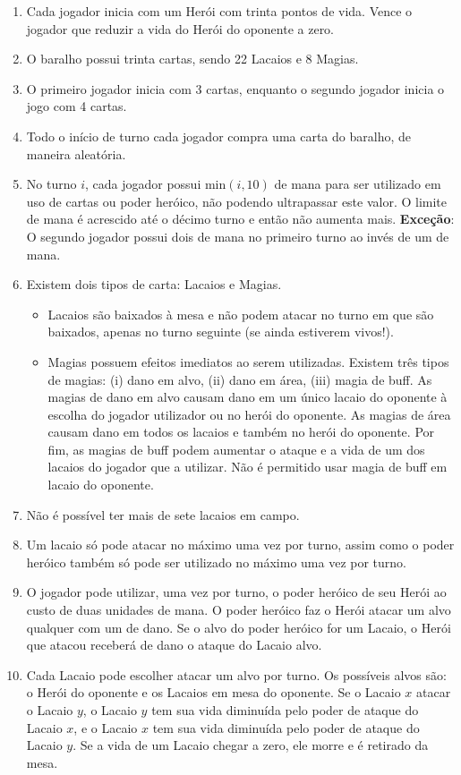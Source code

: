 \documentclass[10pt]{article}
\begin{document}
\begin{enumerate}
    \item Cada jogador inicia com um Herói com trinta pontos de vida. Vence o jogador que reduzir a vida do Herói do oponente a zero.
    \item O baralho possui trinta cartas, sendo 22 Lacaios e 8 Magias.
    \item O primeiro jogador inicia com 3 cartas, enquanto o segundo jogador inicia o jogo com 4 cartas.
    \item Todo o início de turno cada jogador compra uma carta do baralho, de maneira aleatória. 
    \item No turno $i$, cada jogador possui min$(i,10)$ de mana para ser utilizado em uso de cartas ou poder heróico, não podendo ultrapassar este valor. O limite de mana é acrescido até o décimo turno e então não aumenta mais. \textbf{Exceção}: O segundo jogador possui dois de mana no primeiro turno ao invés de um de mana.
    \item Existem dois tipos de carta: Lacaios e Magias. 
    \begin{itemize}
        \item Lacaios são baixados à mesa e não podem atacar no turno em que são baixados, apenas no turno seguinte (se ainda estiverem vivos!).
        \item Magias possuem efeitos imediatos ao serem utilizadas. Existem três tipos de magias: (i) dano em alvo, (ii) dano em área, (iii) magia de buff. As magias de dano em alvo causam dano em um único lacaio do oponente à escolha do jogador utilizador ou no herói do oponente. As magias de área causam dano em todos os lacaios e também no herói do oponente. Por fim, as magias de buff podem aumentar o ataque e a vida de um dos lacaios do jogador que a utilizar. Não é permitido usar magia de buff em lacaio do oponente.
    \end{itemize}
    \item Não é possível ter mais de sete lacaios em campo.
    \item Um lacaio só pode atacar no máximo uma vez por turno, assim como o poder heróico também só pode ser utilizado no máximo uma vez por turno.
    \item O jogador pode utilizar, uma vez por turno, o poder heróico de seu Herói ao custo de duas unidades de mana. O poder heróico faz o Herói atacar um alvo qualquer com um de dano. Se o alvo do poder heróico for um Lacaio, o Herói que atacou receberá de dano o ataque do Lacaio alvo.
    \item Cada Lacaio pode escolher atacar um alvo por turno. Os possíveis alvos são: o Herói do oponente e os Lacaios em mesa do oponente. Se o Lacaio $x$ atacar o Lacaio $y$, o Lacaio $y$ tem sua vida diminuída pelo poder de ataque do Lacaio $x$, e o Lacaio $x$ tem sua vida diminuída pelo poder de ataque do Lacaio $y$. Se a vida de um Lacaio chegar a zero, ele morre e é retirado da mesa.

\end{enumerate}
\end{document}

